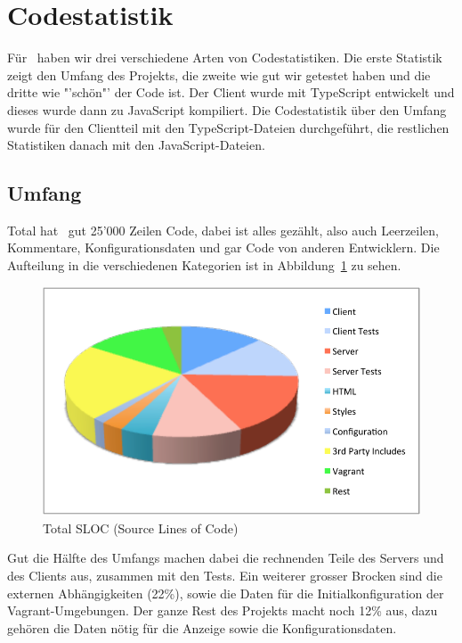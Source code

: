 \section{Codestatistik}
	Für \eeppi\ haben wir drei verschiedene Arten von Codestatistiken.
	Die erste Statistik zeigt den Umfang des Projekts,
	die zweite wie gut wir getestet haben
	und die dritte wie "'schön"' der Code ist.
	Der Client wurde mit TypeScript entwickelt und dieses wurde dann zu JavaScript kompiliert.
	Die Codestatistik über den Umfang wurde für den Clientteil mit den TypeScript-Dateien durchgeführt,
	die restlichen Statistiken danach mit den JavaScript-Dateien.
	
	\subsection{Umfang}
	Total hat \eeppi\ gut 25'000 Zeilen Code, dabei ist alles gezählt,
	also auch Leerzeilen, Kommentare, Konfigurationsdaten und gar Code von anderen Entwicklern.
	Die Aufteilung in die verschiedenen Kategorien ist in Abbildung\ \ref{fig:TotalSLOC} zu sehen.
	\begin{figure}[H]
		\includegraphics[width=\largeThird\textwidth]{projectPlan/media/img/totalSLOC.pdf}
		\centering
		\caption{Total SLOC (Source Lines of Code)}
		\label{fig:TotalSLOC}
	\end{figure}
	
	Gut die Hälfte des Umfangs machen dabei die rechnenden Teile des Servers und des Clients aus,
	zusammen mit den Tests.
	Ein weiterer grosser Brocken sind die externen Abhängigkeiten (22\%),
	sowie die Daten für die Initialkonfiguration der Vagrant-Umgebungen.
	Der ganze Rest des Projekts macht noch 12\% aus,
	dazu gehören die Daten nötig für die Anzeige sowie die Konfigurationsdaten.
	
